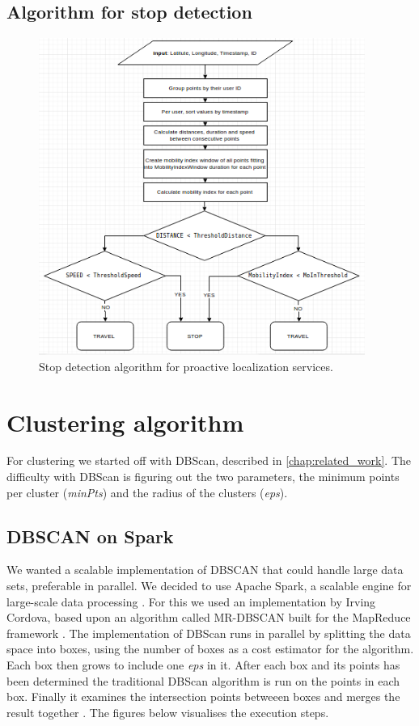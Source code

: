 \subsection{Algorithm for stop detection}

\begin{figure}[!ht]
	\centering
	\includegraphics[width=0.95\textwidth]{images/stop_algo.png}
	\caption{ Stop detection algorithm for proactive localization services. }
	\label{fig:stop_algo}
\end{figure} 

\FloatBarrier

\section{Clustering algorithm}

For clustering we started off with DBScan, described in \autoref{chap:related_work}. The difficulty with DBScan is figuring out the two parameters, the minimum points per cluster (\textit{minPts}) and the radius of the clusters (\textit{eps}). 

\subsection{DBSCAN on Spark}

We wanted a scalable implementation of DBSCAN that could handle large data sets, preferable in parallel. We decided to use Apache Spark, a scalable engine for large-scale data processing \cite{spark}. For this we used an implementation by Irving Cordova, based upon an algorithm called MR-DBSCAN built for the MapReduce framework \cite{dbscan_on_spark}. The implementation of DBScan runs in parallel by splitting the data space into boxes, using the number of boxes as a cost estimator for the algorithm. Each box then grows to include one \textit{eps} in it. After each box and its points has been determined the traditional DBScan algorithm is run on the points in each box. Finally it examines the intersection points betweeen boxes and merges the result together \cite{vis_dbscan_on_spark}. The figures below visualises the execution steps.

